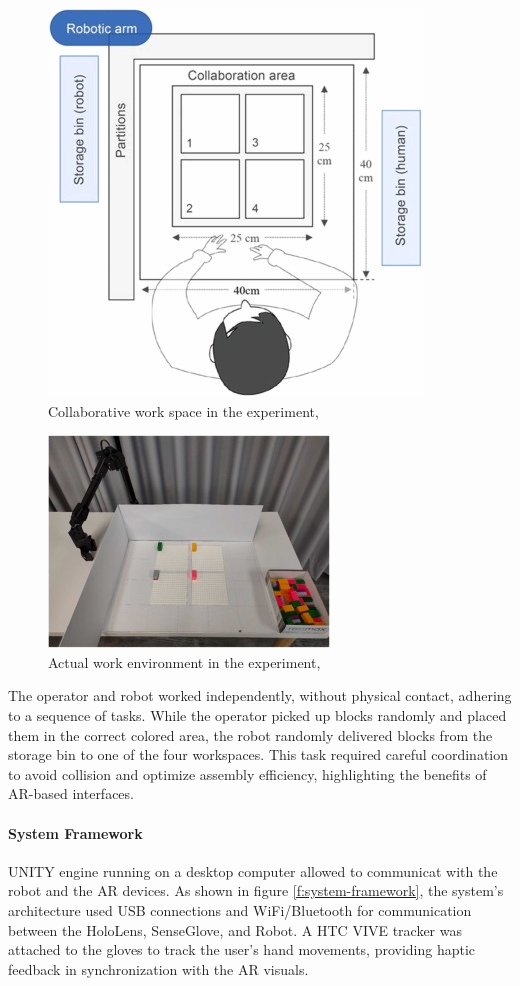 \begin{enumerate}
\begin{figure}[!htpb]
    \centering
    \includegraphics[width=0.4\linewidth]{figs/area-1.jpg}
    \caption{Collaborative work space in the experiment, \cite{CHU2023313}}
    \label{f:area-1}
\end{figure}

\begin{figure}[!htpb]
    \centering
    \includegraphics[width=0.4\linewidth]{figs/robot-area-1.jpg}
    \caption{Actual work environment in the experiment, \cite{CHU2023313}}
    \label{f:robot-area-1}
\end{figure}

The operator and robot worked independently, without physical contact, adhering to a sequence of tasks. While the operator picked up blocks randomly and placed them in the correct colored area, the robot randomly delivered blocks from the storage bin to one of the four workspaces. This task required careful coordination to avoid collision and optimize assembly efficiency, highlighting the benefits of \ac{AR}-based interfaces.

\paragraph{System Framework}
UNITY engine running on a desktop computer allowed to communicat with the robot and the \ac{AR} devices. As shown in figure \ref{f:system-framework}, the system's architecture used USB connections and WiFi/Bluetooth for communication between the HoloLens, SenseGlove, and Robot. A HTC VIVE tracker was attached to the gloves to track the user's hand movements, providing haptic feedback in synchronization with the \ac{AR} visuals.


\end{enumerate}
